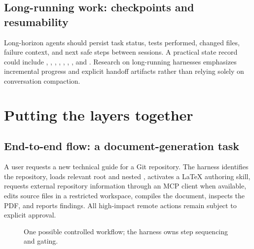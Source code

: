 \documentclass[11pt,letterpaper]{article}
\begin{document}
\subsection{Long-running work: checkpoints and resumability}
Long-horizon agents should persist task status, tests performed, changed files, failure context, and next safe steps between sessions. A practical state record could include , , , , , , , and . Research on long-running harnesses emphasizes incremental progress and explicit handoff artifacts rather than relying solely on conversation compaction.\cite{anthropicharness,harnesslangchain}

\section{Putting the layers together}\label{sec:integrate}
\subsection{End-to-end flow: a document-generation task}
A user requests a new technical guide for a Git repository. The harness identifies the repository, loads relevant root and nested , activates a LaTeX authoring skill, requests external repository information through an MCP client when available, edits source files in a restricted workspace, compiles the document, inspects the PDF, and reports findings. All high-impact remote actions remain subject to explicit approval.

\begin{figure}[htbp]\centering
{}
\caption{One possible controlled workflow; the harness owns step sequencing and gating.}
\end{figure}
\end{document}
